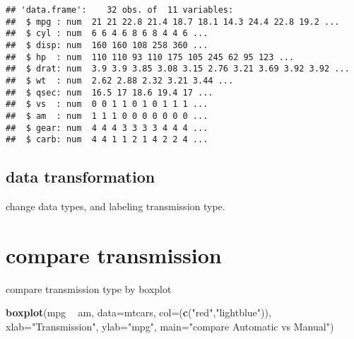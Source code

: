 \documentclass[
]{article}
\newenvironment{Shaded}{\begin{snugshade}}{\end{snugshade}}
\newcommand{\DataTypeTok}[1]{\textcolor[rgb]{0.13,0.29,0.53}{#1}}
\newcommand{\KeywordTok}[1]{\textcolor[rgb]{0.13,0.29,0.53}{\textbf{#1}}}
\newcommand{\NormalTok}[1]{#1}
\newcommand{\OperatorTok}[1]{\textcolor[rgb]{0.81,0.36,0.00}{\textbf{#1}}}
\newcommand{\StringTok}[1]{\textcolor[rgb]{0.31,0.60,0.02}{#1}}
\begin{document}
\begin{verbatim}
## 'data.frame':    32 obs. of  11 variables:
##  $ mpg : num  21 21 22.8 21.4 18.7 18.1 14.3 24.4 22.8 19.2 ...
##  $ cyl : num  6 6 4 6 8 6 8 4 4 6 ...
##  $ disp: num  160 160 108 258 360 ...
##  $ hp  : num  110 110 93 110 175 105 245 62 95 123 ...
##  $ drat: num  3.9 3.9 3.85 3.08 3.15 2.76 3.21 3.69 3.92 3.92 ...
##  $ wt  : num  2.62 2.88 2.32 3.21 3.44 ...
##  $ qsec: num  16.5 17 18.6 19.4 17 ...
##  $ vs  : num  0 0 1 1 0 1 0 1 1 1 ...
##  $ am  : num  1 1 1 0 0 0 0 0 0 0 ...
##  $ gear: num  4 4 4 3 3 3 3 4 4 4 ...
##  $ carb: num  4 4 1 1 2 1 4 2 2 4 ...
\end{verbatim}

\hypertarget{data-transformation}{%
\subsection{data transformation}\label{data-transformation}}

change data types, and labeling transmission type.

\begin{Shaded}
\end{Shaded}

\hypertarget{compare-transmission}{%
\section{compare transmission}\label{compare-transmission}}

compare transmission type by boxplot

\begin{Shaded}
\begin{Highlighting}[]
\KeywordTok{boxplot}\NormalTok{(mpg }\OperatorTok{~}\StringTok{ }\NormalTok{am, }\DataTypeTok{data=}\NormalTok{mtcars, }\DataTypeTok{col=}\NormalTok{(}\KeywordTok{c}\NormalTok{(}\StringTok{"red"}\NormalTok{,}\StringTok{"lightblue"}\NormalTok{)), }\DataTypeTok{xlab=}\StringTok{"Transmission"}\NormalTok{, }\DataTypeTok{ylab=}\StringTok{"mpg"}\NormalTok{, }\DataTypeTok{main=}\StringTok{"compare Automatic vs Manual"}\NormalTok{)}
\end{Highlighting}
\end{Shaded}
\end{document}
